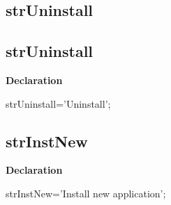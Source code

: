 \documentclass{report}
\newif\ifpdf
\begin{document}
\subsection*{\large{\textbf{strUninstall}}\normalsize\hspace{1ex}\hrulefill}
\else
\subsection*{strUninstall}
\fi
\label{trstrings-strUninstall}
\begin{list}{}{
\setlength{\itemindent}{0cm}
\setlength{\listparindent}{0cm}
\setlength{\leftmargin}{\evensidemargin}
\addtolength{\leftmargin}{\tmplength}
\settowidth{\labelsep}{X}
\addtolength{\leftmargin}{\labelsep}
\setlength{\labelwidth}{\tmplength}
}
\item[\textbf{Declaration}\hfill]
\ifpdf
\begin{flushleft}
\fi
\begin{ttfamily}
strUninstall='Uninstall';\end{ttfamily}

\ifpdf
\end{flushleft}
\fi

\end{list}
\ifpdf
\subsection*{\large{\textbf{strInstNew}}\normalsize\hspace{1ex}\hrulefill}
\else
\subsection*{strInstNew}
\fi
\label{trstrings-strInstNew}
\begin{list}{}{
\setlength{\itemindent}{0cm}
\setlength{\listparindent}{0cm}
\setlength{\leftmargin}{\evensidemargin}
\addtolength{\leftmargin}{\tmplength}
\settowidth{\labelsep}{X}
\addtolength{\leftmargin}{\labelsep}
\setlength{\labelwidth}{\tmplength}
}
\item[\textbf{Declaration}\hfill]
\ifpdf
\begin{flushleft}
\fi
\begin{ttfamily}
strInstNew='Install new application';\end{ttfamily}

\ifpdf
\end{flushleft}
\fi

\end{list}
\ifpdf
\end{document}
